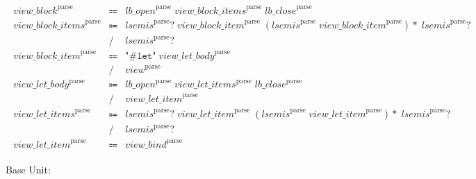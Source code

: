 \begin{align*}
    \begin{array}{rcll}
        \mathit{view\_block}^\mathrm{parse}
        &\Coloneq &\mathit{lb\_open}^\mathrm{parse}\; \mathit{view\_block\_items}^\mathrm{parse}\; \mathit{lb\_close}^\mathrm{parse} \\
        \mathit{view\_block\_items}^\mathrm{parse}
        &\Coloneq &\mathit{lsemis}^\mathrm{parse}{?}\; \mathit{view\_block\_item}^\mathrm{parse}\; (\mathit{lsemis}^\mathrm{parse}\; \mathit{view\_block\_item}^\mathrm{parse}){*}\; \mathit{lsemis}^\mathrm{parse}{?} \\
        &\mathrel{/} &\mathit{lsemis}^\mathrm{parse}{?} \\
        \mathit{view\_block\_item}^\mathrm{parse}
        &\Coloneq &\texttt{"\#let"}\; \mathit{view\_let\_body}^\mathrm{parse} \\
        &\mathrel{/} &\mathit{view}^\mathrm{parse} \\
        \mathit{view\_let\_body}^\mathrm{parse}
        &\Coloneq &\mathit{lb\_open}^\mathrm{parse}\; \mathit{view\_let\_items}^\mathrm{parse}\; \mathit{lb\_close}^\mathrm{parse} \\
        &\mathrel{/} &\mathit{view\_let\_item}^\mathrm{parse} \\
        \mathit{view\_let\_items}^\mathrm{parse}
        &\Coloneq &\mathit{lsemis}^\mathrm{parse}{?}\; \mathit{view\_let\_item}^\mathrm{parse}\; (\mathit{lsemis}^\mathrm{parse}\; \mathit{view\_let\_item}^\mathrm{parse}){*}\; \mathit{lsemis}^\mathrm{parse}{?} \\
        &\mathrel{/} &\mathit{lsemis}^\mathrm{parse}{?} \\
        \mathit{view\_let\_item}^\mathrm{parse}
        &\Coloneq &\mathit{view\_bind}^\mathrm{parse}
    \end{array}
\end{align*}

Base Unit:

